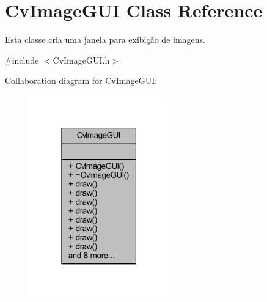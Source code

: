 \hypertarget{class_viscv_1_1_cv_image_g_u_i}{}\section{Cv\+Image\+G\+U\+I Class Reference}
\label{class_viscv_1_1_cv_image_g_u_i}


Esta classe cria uma janela para exibição de imagens.  




{\ttfamily \#include $<$Cv\+Image\+G\+U\+I.\+h$>$}



Collaboration diagram for Cv\+Image\+G\+U\+I\+:
\nopagebreak
\begin{figure}[H]
\begin{center}
\leavevmode
\includegraphics[width=171pt]{class_viscv_1_1_cv_image_g_u_i__coll__graph}
\end{center}
\end{figure}
